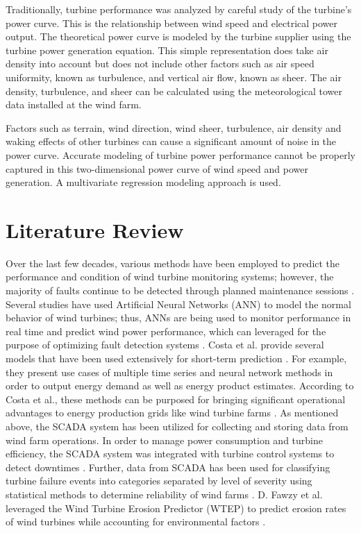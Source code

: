 \documentclass[runningheads]{llncs}
\begin{document}
Traditionally, turbine performance was analyzed by careful study of the turbine's power curve. This is the relationship between wind speed and electrical power output. The theoretical power curve is modeled by the turbine supplier using the turbine power generation equation. This simple representation does take air density into account but does not include other factors such as air speed uniformity, known as turbulence, and vertical air flow, known as sheer. The air density, turbulence, and sheer can be calculated using the meteorological tower data installed at the wind farm\cite{Wan}. 

 Factors such as terrain, wind direction, wind sheer, turbulence, air density and waking effects of other turbines can cause a significant amount of noise in the power curve. Accurate modeling of turbine power performance cannot be properly captured in this two-dimensional power curve of wind speed and power generation. A multivariate regression modeling approach is used. 

\section{Literature Review} 
Over the last few decades, various methods have been employed to predict the performance and condition of wind turbine monitoring systems; however, the majority of faults continue to be detected through planned maintenance sessions \cite{Karlsson}. Several studies have used Artificial Neural Networks (ANN) to model the normal behavior of wind turbines; thus, ANNs are being used to monitor performance in real time and predict wind power performance, which can leveraged for the purpose of optimizing fault detection systems \cite{Karlsson}. Costa et al. provide several models that have been used extensively for short-term prediction \cite{Costa}. For example, they present use cases of multiple time series and neural network methods in order to output energy demand as well as energy product estimates. According to Costa et al., these methods can be purposed for bringing significant operational advantages to energy production grids like wind turbine farms \cite{Costa}. As mentioned above, the SCADA system has been utilized for collecting and storing data from wind farm operations. In order to manage power consumption and turbine efficiency, the SCADA system was integrated with turbine control systems to detect downtimes \cite{Kim}. Further, data from SCADA has been used for classifying turbine failure events into categories separated by level of severity using statistical methods to determine reliability of wind farms \cite{Hill}. D. Fawzy et al. leveraged the Wind Turbine Erosion Predictor (WTEP) to predict erosion rates of wind turbines while accounting for environmental factors \cite{Fawzy}.
\end{document}
